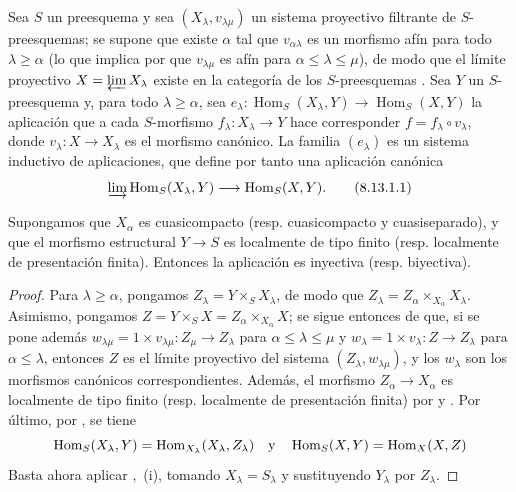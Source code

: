 \begin{proposition}[8.13.1]
\label{IV.8.13.1-fr}
Sea $S$ un preesquema y sea $(X_\lambda,v_{\lambda\mu})$ un sistema proyectivo filtrante de $S$-preesquemas; se supone que existe $\alpha$ tal que $v_{\alpha\lambda}$ es un morfismo afín para todo $\lambda\geqslant
\alpha$ (lo que implica por  que $v_{\lambda\mu}$ es afín para $\alpha\leqslant\lambda\leqslant\mu$), de modo que el límite proyectivo $X=\varprojlim X_\lambda$ existe en la categoría de los $S$-preesquemas .
Sea $Y$ un $S$-preesquema y, para todo $\lambda\geqslant\alpha$, sea $e_\lambda:\operatorname{Hom}_S(X_\lambda,Y)
\to\operatorname{Hom}_S(X,Y)$ la aplicación que a cada $S$-morfismo $f_\lambda:X_\lambda\to Y$ hace corresponder $f=f_\lambda\circ v_\lambda$, donde $v_\lambda:X\to X_\lambda$ es el morfismo canónico.
La familia $(e_\lambda)$ es un sistema inductivo de aplicaciones, que define por tanto una aplicación canónica
\begin{equation}
\label{IV.8.13.1.1-fr}
\varinjlim\operatorname{Hom}_S(X_\lambda,Y)
\longrightarrow\operatorname{Hom}_S(X,Y). \tag{8.13.1.1}
\end{equation}

Supongamos que $X_\alpha$ es cuasicompacto (\textup{resp.} cuasicompacto y cuasiseparado), y que el morfismo estructural $Y\to S$ es localmente de tipo finito (\textup{resp.} localmente de presentación finita).
Entonces la aplicación  es inyectiva (\textup{resp.} biyectiva).
\end{proposition}

\begin{proof}
Para $\lambda\geqslant\alpha$, pongamos $Z_\lambda=Y\times_S X_\lambda$, de modo que $Z_\lambda=Z_\alpha\times_{X_\alpha}X_\lambda$.
Asimismo, pongamos $Z=Y\times_S X=Z_\alpha\times_{X_\alpha}X$; se sigue entonces de  que, si se pone además $w_{\lambda\mu}=1\times v_{\lambda\mu}:Z_\mu\to Z_\lambda$ para $\alpha\leqslant\lambda\leqslant\mu$ y $w_\lambda=1\times v_\lambda:Z\to Z_\lambda$ para $\alpha\leqslant\lambda$, entonces $Z$ es el límite proyectivo del sistema $(Z_\lambda,w_{\lambda\mu})$, y los $w_\lambda$ son los morfismos canónicos correspondientes.
Además, el morfismo $Z_\alpha\to X_\alpha$ es localmente de tipo finito (resp. localmente de presentación finita) por  y .
Por último, por , se tiene
\[
\operatorname{Hom}_S(X_\lambda,Y)
=\operatorname{Hom}_{X_\lambda}(X_\lambda,Z_\lambda)
\quad\hbox{y}\quad
\operatorname{Hom}_S(X,Y)=\operatorname{Hom}_X(X,Z)
\]
Basta ahora aplicar ,~(i), tomando $X_\lambda=S_\lambda$ y sustituyendo $Y_\lambda$ por $Z_\lambda$.
\end{proof}

